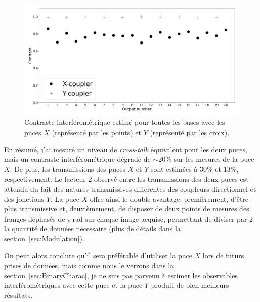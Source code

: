 \begin{figure}[ht!]
    \centering
    \includegraphics[width=\figwidth]{Figure_Chap2/ContrastComparison_20201124_20201119_LaTex.png}
    \caption[Contraste interférométrique estimé pour toutes les bases avec les puces $X$ et $Y$.]{Contraste interférométrique estimé pour toutes les bases avec les puces $X$ (représenté par les points) et $Y$ (représenté par les croix).}
    \label{fig:ChipContrast}
\end{figure}


\label{sec:ChipCharacDiscu}

En résumé, j'ai mesuré un niveau de \textit{cross-talk} équivalent pour les deux puces, mais un contraste interférométrique dégradé de $\sim 20\%$ sur les mesures de la puce $X$. De plus, les transmissions des puces $X$ et $Y$ sont estimées à $30\%$ et $13\%$, respectivement. Le facteur $2$ observé entre les transmissions des deux puces est attendu du fait des natures transmissives différentes des coupleurs directionnel et des jonctions $Y$. La puce $X$ offre ainsi le double avantage, premièrement, d'être plus transmissive et, deuxièmement, de disposer de deux points de mesures des franges déphasés de $\pi \,$rad sur chaque image acquise, permettant de diviser par 2 la quantité de données nécessaire (plus de détails dans la section~\ref{sec:Modulation}).

On peut alors conclure qu'il sera préférable d'utiliser la puce $X$ lors de futurs prises de données, mais comme nous le verrons dans la section~\ref{sec:BinaryCharac}, je ne suis pas parvenu à estimer les observables interférométriques avec cette puce et la puce $Y$ produit de bien meilleurs résultats.

